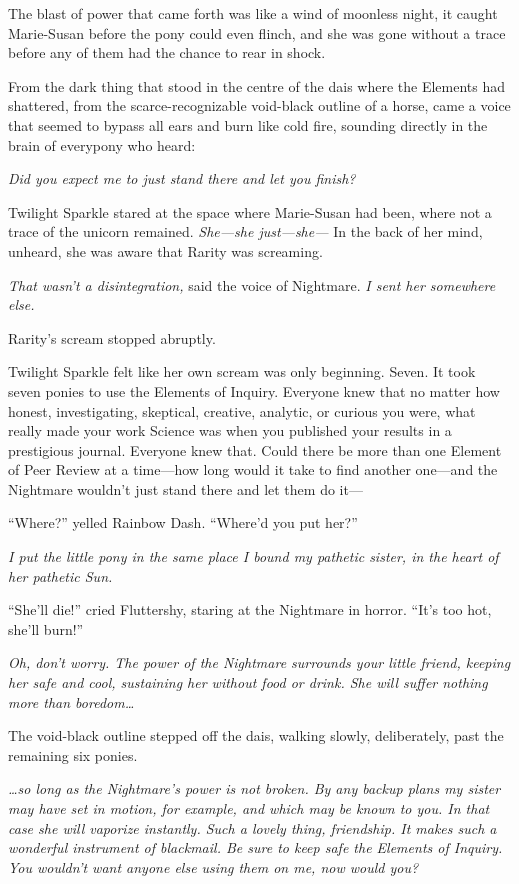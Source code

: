 The blast of power that came forth was like a wind of moonless night, it caught Marie-Susan before the pony could even flinch, and she was gone without a trace before any of them had the chance to rear in shock.

From the dark thing that stood in the centre of the dais where the Elements had shattered, from the scarce-recognizable void-black outline of a horse, came a voice that seemed to bypass all ears and burn like cold fire, sounding directly in the brain of everypony who heard:

\emph{Did you expect me to just stand there and let you finish?}

Twilight Sparkle stared at the space where Marie-Susan had been, where not a trace of the unicorn remained. \emph{She—she just—she—} In the back of her mind, unheard, she was aware that Rarity was screaming.

\emph{That wasn’t a disintegration,} said the voice of Nightmare. \emph{I sent her somewhere else.}

Rarity’s scream stopped abruptly.

Twilight Sparkle felt like her own scream was only beginning. Seven. It took seven ponies to use the Elements of Inquiry. Everyone knew that no matter how honest, investigating, skeptical, creative, analytic, or curious you were, what really made your work Science was when you published your results in a prestigious journal. Everyone knew that. Could there be more than one Element of Peer Review at a time—how long would it take to find another one—and the Nightmare wouldn’t just stand there and let them do it—

“Where?” yelled Rainbow Dash. “Where’d you put her?”

\emph{I put the little pony in the same place I bound my pathetic sister, in the heart of her pathetic Sun.}

“She’ll die!” cried Fluttershy, staring at the Nightmare in horror. “It’s too hot, she’ll burn!”

\emph{Oh, don’t worry. The power of the Nightmare surrounds your little friend, keeping her safe and cool, sustaining her without food or drink. She will suffer nothing more than boredom…}

The void-black outline stepped off the dais, walking slowly, deliberately, past the remaining six ponies.

\emph{…so long as the Nightmare’s power is not broken. By any backup plans my sister may have set in motion, for example, and which may be known to you. In that case she will vaporize instantly. Such a lovely thing, friendship. It makes such a wonderful instrument of blackmail. Be sure to keep safe the Elements of Inquiry. You wouldn’t want anyone else using them on me, now would you?}

